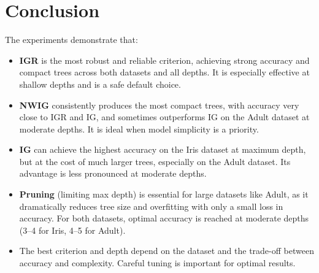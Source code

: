 \documentclass{article}
\begin{document}
\section*{Conclusion}
The experiments demonstrate that:
\begin{itemize}
    \item \textbf{IGR} is the most robust and reliable criterion, achieving strong accuracy and compact trees across both datasets and all depths. It is especially effective at shallow depths and is a safe default choice.
    \item \textbf{NWIG} consistently produces the most compact trees, with accuracy very close to IGR and IG, and sometimes outperforms IG on the Adult dataset at moderate depths. It is ideal when model simplicity is a priority.
    \item \textbf{IG} can achieve the highest accuracy on the Iris dataset at maximum depth, but at the cost of much larger trees, especially on the Adult dataset. Its advantage is less pronounced at moderate depths.
    \item \textbf{Pruning} (limiting max depth) is essential for large datasets like Adult, as it dramatically reduces tree size and overfitting with only a small loss in accuracy. For both datasets, optimal accuracy is reached at moderate depths (3--4 for Iris, 4--5 for Adult).
    \item The best criterion and depth depend on the dataset and the trade-off between accuracy and complexity. Careful tuning is important for optimal results.
\end{itemize}
\end{document}
